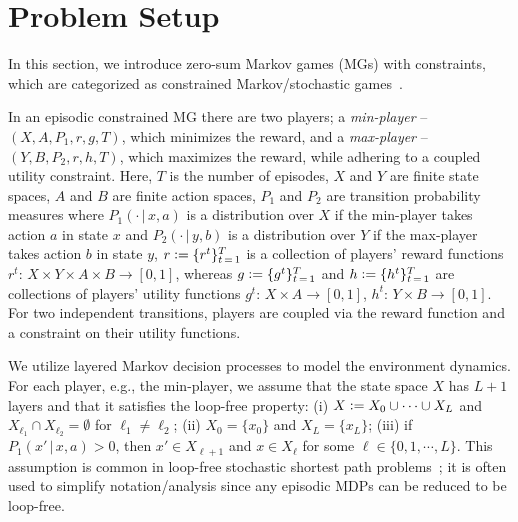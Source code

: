 \documentclass[12pt, final]{l4dc2023}
\begin{document}
\vspace*{-1ex}
\section{Problem Setup}
\label{prelim}

In this section, we introduce zero-sum Markov games (MGs) with constraints, which are categorized as constrained Markov/stochastic games~\citep{altman2000constrained,altman2005zero,altman2008constrained}. 

In an episodic constrained MG there are two players; a \emph{min-player} -- $(X, A, P_1, r, g,T)$, which minimizes the reward, and a \emph{max-player} -- $(Y, B, P_2, r, h,T)$, which maximizes the reward, while adhering to a coupled utility constraint. Here, $T$ is the number of episodes, $X$ and $Y$  are finite state spaces, $A$ and $B$ are finite action spaces, $P_1$ and $P_2$ are transition probability measures where $P_1 (\cdot \,|\, x, a)$ is a distribution over $X$ if the min-player takes action $a$ in state $x$ and $P_2 (\cdot \,|\, y, b)$ is a distribution over $Y$ if the max-player takes action $b$ in state $y$, $r \mathrel{\mathop:}= \{r^t\}_{t\,=\,1}^T$ is a collection of players' reward functions $r^t$: $X\times Y\times A\times B\to [0,1]$, whereas $g \mathrel{\mathop:}= \{g^t\}_{t\,=\,1}^T$ and $h\mathrel{\mathop:}= \{h^t \}_{t\,=\,1}^T$ are collections of players' utility functions $g^t$: $X\times A\to [0,1]$, $h^t$: $Y\times B\to [0,1]$. For two independent transitions, players are coupled via the reward function and a constraint on their utility functions. 

We utilize layered Markov decision processes to model the environment dynamics. For each player, e.g., the min-player, we assume that the state space $X$ has $L+1$ layers and that it satisfies the loop-free property: (i) $X \mathrel{\mathop:}= X_{0} \cup\cdots\cup X_{L}$ and $X_{\ell_1}\cap X_{\ell_2}=\emptyset$ for $\ell_1\neq \ell_2$; (ii) $X_0=\{ x_0 \}$ and $X_L=\{ x_L \}$; (iii) if $P_1( x' \,\vert\, x, a) >0$, then $x' \in X_{\ell+1}$ and $x\in X_\ell$ for some $\ell \in \{0,1,\cdots,L\}$. This assumption is common in loop-free stochastic shortest path problems~\citep{gyorgy2007line,jaksch2010near,neu2010online,rosenberg2019online,jin2020learning}; it is often used to simplify notation/analysis since any episodic MDPs can be reduced to be loop-free.
\end{document}
